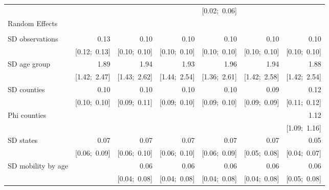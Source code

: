 \begin{sidewaystable}[htp]
\begin{center}
{\begin{tabular}{l D{.}{.}{6.11} D{.}{.}{6.11} D{.}{.}{6.11} D{.}{.}{6.11} D{.}{.}{6.11} D{.}{.}{6.11} }
                               &                 &                 &                 & [0.02;\ 0.06]   &                 &                 \\
Random Effects                 &                 &                 &                 &                 &                 &                 \\
                               &                 &                 &                 &                 &                 &                 \\
\quad SD observations          & 0.13            & 0.10            & 0.10            & 0.10            & 0.10            & 0.10            \\
                               & [0.12;\ 0.13]   & [0.10;\ 0.10]   & [0.10;\ 0.10]   & [0.10;\ 0.10]   & [0.10;\ 0.10]   & [0.10;\ 0.10]   \\
\quad SD age group             & 1.89            & 1.94            & 1.93            & 1.96            & 1.94            & 1.88            \\
                               & [1.42;\ 2.47]   & [1.43;\ 2.62]   & [1.44;\ 2.54]   & [1.36;\ 2.61]   & [1.42;\ 2.58]   & [1.42;\ 2.54]   \\
\quad SD counties              & 0.10            & 0.10            & 0.10            & 0.10            & 0.09            & 0.12            \\
                               & [0.10;\ 0.10]   & [0.09;\ 0.11]   & [0.09;\ 0.10]   & [0.09;\ 0.10]   & [0.09;\ 0.09]   & [0.11;\ 0.12]   \\
\quad Phi counties             &                 &                 &                 &                 &                 & 1.12            \\
                               &                 &                 &                 &                 &                 & [1.09;\ 1.16]   \\
\quad SD states                & 0.07            & 0.07            & 0.07            & 0.07            & 0.07            & 0.05            \\
                               & [0.06;\ 0.09]   & [0.06;\ 0.10]   & [0.06;\ 0.10]   & [0.06;\ 0.09]   & [0.05;\ 0.08]   & [0.04;\ 0.07]   \\
\quad SD mobility by age       &                 & 0.06            & 0.06            & 0.06            & 0.06            & 0.06            \\
                               &                 & [0.04;\ 0.08]   & [0.04;\ 0.08]   & [0.04;\ 0.08]   & [0.04;\ 0.08]   & [0.05;\ 0.08]   \\

\end{tabular}}
\end{center}
\end{sidewaystable}

